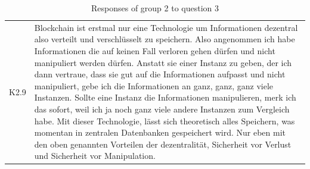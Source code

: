 \begin{table}[H]
\begin{tabularx}{\textwidth}{r|X}
         K2.9 & Blockchain ist erstmal nur eine Technologie um Informationen dezentral also verteilt und verschlüsselt zu speichern. Also angenommen ich habe Informationen die auf keinen Fall verloren gehen dürfen und nicht manipuliert werden dürfen. Anstatt sie einer Instanz zu geben, der ich dann vertraue, dass sie gut auf die Informationen aufpasst und nicht manipuliert, gebe ich die Informationen an ganz, ganz, ganz viele Instanzen. Sollte eine Instanz die Informationen manipulieren, merk ich das sofort, weil ich ja noch ganz viele andere Instanzen zum Vergleich habe. Mit dieser Technologie, lässt sich theoretisch alles Speichern, was momentan in zentralen Datenbanken gespeichert wird. Nur eben mit den oben genannten Vorteilen der dezentralität, Sicherheit vor Verlust und Sicherheit vor Manipulation. \\
    \end{tabularx}
    \caption{Responses of group 2 to question 3}
    \label{tab:Artefakt3}
\end{table}


